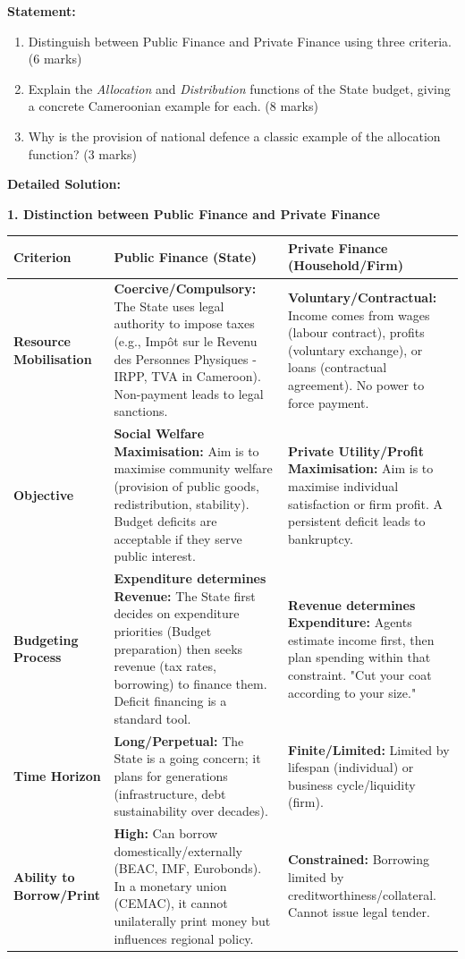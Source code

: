 \documentclass[11pt]{article}
\newcommand{\cle}[1]{{\popxbold\color{popdark}#1}}
\begin{document}
\begin{exoresolu}
\textbf{Statement:}
\begin{enumerate}
    \item Distinguish between Public Finance and Private Finance using three criteria. (6 marks)
    \item Explain the \emph{Allocation} and \emph{Distribution} functions of the State budget, giving a concrete Cameroonian example for each. (8 marks)
    \item Why is the provision of national defence a classic example of the allocation function? (3 marks)
\end{enumerate}
\tcblower
\textbf{Detailed Solution:}

\textbf{1. Distinction between Public Finance and Private Finance}

\begin{center}
\begin{tabularx}{\linewidth}{|l|X|X|}
\hline
\rowcolor{popblueL} \textbf{Criterion} & \textbf{Public Finance (State)} & \textbf{Private Finance (Household/Firm)} \\
\hline
\textbf{Resource Mobilisation} & \textbf{Coercive/Compulsory:} The State uses legal authority to impose taxes (e.g., \cle{Impôt sur le Revenu des Personnes Physiques - IRPP}, \cle{TVA} in Cameroon). Non-payment leads to legal sanctions. & \textbf{Voluntary/Contractual:} Income comes from wages (labour contract), profits (voluntary exchange), or loans (contractual agreement). No power to force payment. \\
\hline
\textbf{Objective} & \textbf{Social Welfare Maximisation:} Aim is to maximise community welfare (provision of public goods, redistribution, stability). Budget deficits are acceptable if they serve public interest. & \textbf{Private Utility/Profit Maximisation:} Aim is to maximise individual satisfaction or firm profit. A persistent deficit leads to bankruptcy. \\
\hline
\textbf{Budgeting Process} & \textbf{Expenditure determines Revenue:} The State first decides on expenditure priorities (Budget preparation) then seeks revenue (tax rates, borrowing) to finance them. Deficit financing is a standard tool. & \textbf{Revenue determines Expenditure:} Agents estimate income first, then plan spending within that constraint. "Cut your coat according to your size." \\
\hline
\textbf{Time Horizon} & \textbf{Long/Perpetual:} The State is a going concern; it plans for generations (infrastructure, debt sustainability over decades). & \textbf{Finite/Limited:} Limited by lifespan (individual) or business cycle/liquidity (firm). \\
\hline
\textbf{Ability to Borrow/Print} & \textbf{High:} Can borrow domestically/externally (BEAC, IMF, Eurobonds). In a monetary union (CEMAC), it cannot unilaterally print money but influences regional policy. & \textbf{Constrained:} Borrowing limited by creditworthiness/collateral. Cannot issue legal tender. \\
\hline
\end{tabularx}
\end{center}


\end{exoresolu}
\end{document}
